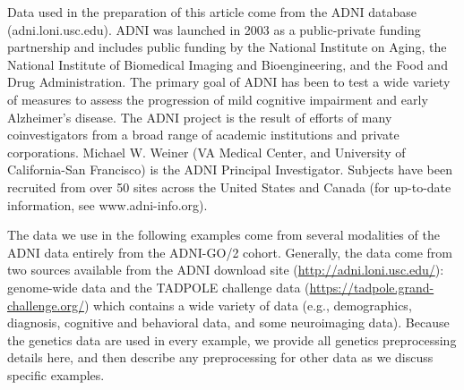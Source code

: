 \documentclass[12pt]{article}
\begin{document}
\label{section:data}

Data used in the preparation of this article come from the ADNI database
(adni.loni.usc.edu). ADNI was launched in 2003 as a public-private
funding partnership and includes public funding by the National
Institute on Aging, the National Institute of Biomedical Imaging and
Bioengineering, and the Food and Drug Administration. The primary goal
of ADNI has been to test a wide variety of measures to assess the
progression of mild cognitive impairment and early Alzheimer's disease.
The ADNI project is the result of efforts of many coinvestigators from a
broad range of academic institutions and private corporations. Michael
W. Weiner (VA Medical Center, and University of California-San
Francisco) is the ADNI Principal Investigator. Subjects have been
recruited from over 50 sites across the United States and Canada (for
up-to-date information, see www.adni-info.org).

The data we use in the following examples come from several modalities
of the ADNI data entirely from the ADNI-GO/2 cohort. Generally, the data
come from two sources available from the ADNI download site
(\url{http://adni.loni.usc.edu/}): genome-wide data and the TADPOLE
challenge data (\url{https://tadpole.grand-challenge.org/}) which
contains a wide variety of data (e.g., demographics, diagnosis,
cognitive and behavioral data, and some neuroimaging data). Because the
genetics data are used in every example, we provide all genetics
preprocessing details here, and then describe any preprocessing for
other data as we discuss specific examples.
\end{document}
